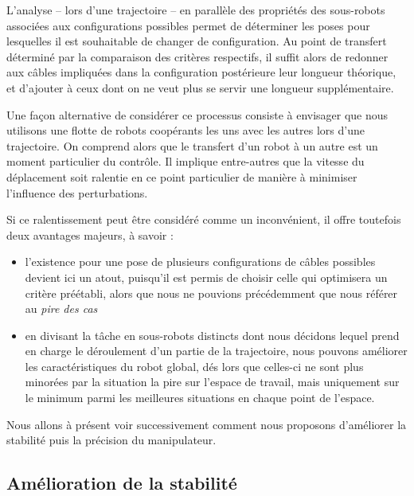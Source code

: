 L'analyse -- lors d'une trajectoire -- en parall\`ele des propri\'et\'es des 
sous-robots associ\'ees aux configurations possibles permet de d\'eterminer les 
poses pour lesquelles il est souhaitable de changer de configuration. Au point 
de transfert d\'etermin\'e par la comparaison des crit\`eres respectifs, il 
suffit alors de redonner aux c\^ables impliqu\'ees dans la configuration 
post\'erieure leur longueur th\'eorique, et d'ajouter \`a ceux dont on ne veut 
plus se servir une longueur suppl\'ementaire.

Une fa\c con alternative de consid\'erer ce processus consiste \`a envisager 
que nous utilisons une flotte de robots coop\'erants les uns avec les autres 
lors d'une trajectoire. On comprend alors que le transfert d'un robot \`a un 
autre est un moment particulier du contr\^ole. Il implique entre-autres que la 
vitesse du d\'eplacement soit ralentie en ce point particulier de mani\`ere \`a 
minimiser l'influence des perturbations.

Si ce ralentissement peut \^etre consid\'er\'e comme un inconv\'enient, 
il offre toutefois deux avantages majeurs, \`a savoir :
\begin{itemize}
 \item l'existence pour une pose de plusieurs configurations de c\^ables 
possibles devient ici un atout, puisqu'il est permis de choisir celle qui 
optimisera un crit\`ere pr\'e\'etabli, alors que nous ne pouvions 
pr\'ec\'edemment que nous r\'ef\'erer au {\it pire des cas}
  \item en divisant la t\^ache en sous-robots distincts dont nous d\'ecidons 
lequel prend en charge le d\'eroulement d'un partie de la trajectoire, nous 
pouvons am\'eliorer les caract\'eristiques du robot global, d\'es lors que 
celles-ci ne sont plus minor\'ees par la situation la pire sur l'espace de 
travail, mais uniquement sur le minimum parmi les meilleures situations en 
chaque point de l'espace.
\end{itemize}

Nous allons \`a pr\'esent voir successivement comment nous proposons 
d'am\'eliorer la stabilit\'e puis la pr\'ecision du manipulateur.
 

\subsection{Am\'elioration de la stabilit\'e}

